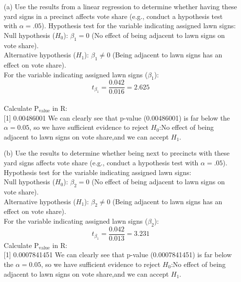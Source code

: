 \documentclass[12pt,letterpaper]{article}
\begin{document}
\begin{enumerate}
	\item [(a)] Use the results from a linear regression to determine whether having these yard signs in a precinct affects vote share (e.g., conduct a hypothesis test with $\alpha = .05$).
	\vspace{10mm}
	Hypothesis test for the variable indicating assigned lawn signs:\\
	Null hypothesis (\(H_0\)): \(\beta_1 = 0\) (No effect of being adjacent to lawn signs on vote share).\\
	Alternative hypothesis (\(H_1\)): \(\beta_1 \neq 0\) (Being adjacent to lawn signs has an effect on vote share).\\
	For the variable indicating assigned lawn signs (\(\beta_1\)):\\
	\[ t_{\beta_1} = \frac{0.042}{0.016}=2.625 \]\\
	Calculate \(\text{P}_\text{value}\) in R:\\
	
	[1] 0.00486001
	We can clearly see that p-value (0.00486001) is far below the $\alpha = 0.05$, so we have sufficient evidence to reject \(H_0\):No effect of being adjacent to lawn signs on vote share,and we can accept \(H_1\).
	
	
	\newpage		
	\item [(b)]  Use the results to determine whether being
	next to precincts with these yard signs affects vote
	share (e.g., conduct a hypothesis test with $\alpha = .05$).\\
	\vspace{10mm}
	Hypothesis test for the variable indicating assigned lawn signs:\\
	Null hypothesis (\(H_0\)): \(\beta_2 = 0\) (No effect of being adjacent to lawn signs on vote share).\\
	Alternative hypothesis (\(H_1\)): \(\beta_2 \neq 0\) (Being adjacent to lawn signs has an effect on vote share).\\
	For the variable indicating assigned lawn signs (\(\beta_2\)):\\
	\[ t_{\beta_1} = \frac{0.042}{0.013}=3.231\]
	Calculate \(\text{P}_\text{value}\) in R:\\

    [1] 0.0007841451
    We can clearly see that p-value (0.0007841451) is far below the $\alpha = 0.05$, so we have sufficient evidence to reject \(H_0\):No effect of being adjacent to lawn signs on vote share,and we can accept \(H_1\).


\end{enumerate}
\end{document}
